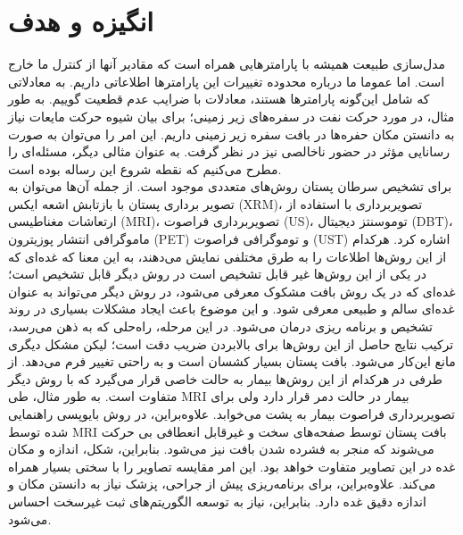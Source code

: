 \section*{انگیزه و هدف}
مدل‌سازی طبیعت همیشه با پارامترهایی همراه است که مقادیر آنها از کنترل ما خارج است. اما عموما ما درباره محدوده تغییرات این پارامترها اطلاعاتی داریم. به معادلاتی که شامل این‌گونه پارامترها هستند، معادلات با ضرایب عدم قطعیت گوییم. به طور مثال، در مورد حرکت نفت در سفره‌های زیر زمینی؛ برای بیان شیوه حرکت مایعات نیاز به دانستن مکان حفره‌ها  در بافت سفره زیر زمینی داریم. این امر را می‌توان به صورت رسانایی مؤثر در حضور ناخالصی نیز در نظر گرفت. به عنوان مثالی دیگر، مسئله‌ای را مطرح می‌کنیم که نقطه شروع این رساله بوده است.\\ 
برای تشخیص سرطان پستان روش‌های متعددی موجود است. از جمله آن‌ها می‌توان به تصویر برداری پستان با بازتابش اشعه ایکس (XRM)، تصویربرداری با استفاده از ارتعاشات مغناطیسی (MRI)، تصویربرداری فراصوت (US)، توموسنتز دیجیتال (DBT)، ماموگرافی انتشار پوزیترون (PET) و توموگرافی فراصوت (UST) اشاره کرد. هرکدام از این روش‌ها اطلاعات را به طرق مختلفی نمایش می‌دهند، به این معنا که غده‌ای که در یکی از این روش‌ها غیر قابل تشخیص است در روش دیگر قابل تشخیص است؛ غده‌ای که در یک روش بافت مشکوک معرفی می‌شود، در روش دیگر می‌تواند به عنوان غده‌ای سالم و طبیعی معرفی شود. و این موضوع باعث ایجاد مشکلات بسیاری در روند تشخیص و برنامه ریزی درمان می‌شود. در این مرحله، راه‌حلی که به ذهن می‌رسد، ترکیب نتایج حاصل از این روش‌ها برای بالابردن ضریب دقت است؛ لیکن مشکل دیگری مانع این‌کار می‌شود. بافت پستان بسیار کشسان است و به راحتی تغییر فرم می‌دهد. از طرفی در هرکدام از این روش‌ها بیمار به حالت خاصی قرار می‌گیرد که با روش دیگر متفاوت است. به طور مثال، طی MRI بیمار در حالت دمر قرار دارد ولی برای تصویربرداری فراصوت بیمار به پشت می‌خوابد. علاوه‌براین، در روش بایوپسی راهنمایی شده توسط MRI بافت پستان توسط صفحه‌های سخت و غیرقابل انعطافی بی حرکت می‌شوند که منجر به فشرده شدن بافت نیز می‌شود. بنابراین، شکل، اندازه و مکان غده در این تصاویر متفاوت خواهد بود. این امر مقایسه تصاویر را با سختی بسیار همراه می‌کند. علاوه‌براین، برای برنامه‌ریزی پیش از جراحی، پزشک نیاز به دانستن مکان و اندازه دقیق غده دارد. بنابراین، نیاز به توسعه الگوریتم‌های ثبت غیرسخت احساس می‌شود.\\
